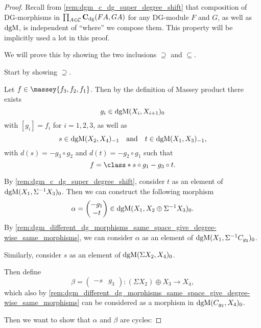 \begin{proof}
    Recall from \autoref{rem:dgm_c_dg_super_degree_shift} that composition of DG-morphisms in \( \prod_{A \in {\mathcal{C}}} \operatorname{\mathbf{C}}_{\operatorname{dg}}(F A, G A) \) for any DG-module \( F \) and \( G \), as well as \( \operatorname{dgM} \), is independent of ``where'' we compose them. This property will be implicitly used a lot in this proof.

    We will prove this by showing the two inclusions \( \supseteq \) and \( \subseteq \).

    Start by showing \( \supseteq \).

    Let \( f \in \massey{f_3, f_2, f_1} \). Then by the definition of Massey product there exists
    \[
        g_i \in \operatorname{dgM}(X_i, X_{i + 1})_0
    \]
    with \( [g_i] = f_i \) for \( i = 1, 2, 3 \), as well as
    \[
        s \in \operatorname{dgM}(X_2, X_4)_{-1} \quad \text{and} \quad t \in \operatorname{dgM}(X_1, X_3)_{-1},
    \]
    with \( d(s) = - g_3 \circ g_2 \) and \( d(t) = - g_2 \circ g_1 \) such that
    \[
        f = \class*{s \circ g_1 - g_3 \circ t}.
    \]

    By \autoref{rem:dgm_c_dg_super_degree_shift}, consider \( t \) as an element of \( \operatorname{dgM}(X_1, \Sigma^{-1} X_3)_0 \). Then we can construct the following morphism
    \[
        \alpha =
        \begin{pmatrix}
            - g_1 \\
            - t
        \end{pmatrix}
        \in \operatorname{dgM}(X_1, X_2 \oplus \Sigma^{-1} X_3)_0.
    \]
    By \autoref{rem:dgm_different_dg_morphisms_same_space_give_degree-wise_same_morphisms}, we can consider \( \alpha \) as an element of \( \operatorname{dgM}(X_1, \Sigma^{-1} C_{g_2})_0 \).

    Similarly, consider \( s \) as an element of \( \operatorname{dgM}(\Sigma X_2, X_4)_0 \).

    Then define
    \[
        \beta =
        \begin{pmatrix}
            - s & g_3
        \end{pmatrix}
        : (\Sigma X_2) \oplus X_3 \to X_4,
    \]
    which also by \autoref{rem:dgm_different_dg_morphisms_same_space_give_degree-wise_same_morphisms} can be considered as a morphism in \( \operatorname{dgM}(C_{g_2}, X_4)_0 \).

    Then we want to show that \( \alpha \) and \( \beta \) are cycles:


\end{proof}
